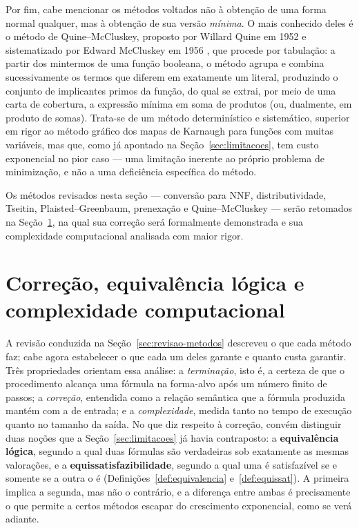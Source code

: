 \documentclass[12pt,a4paper,oneside]{report}
\theoremstyle{tituloplain}
\theoremstyle{titulodef}
\begin{document}
Por fim, cabe mencionar os métodos voltados não à obtenção de uma forma normal qualquer, mas à obtenção de sua versão \textit{mínima}. O mais conhecido deles é o método de Quine--McCluskey, proposto por Willard Quine em 1952 \cite{quine1952} e sistematizado por Edward McCluskey em 1956 \cite{mccluskey1956}, que procede por tabulação: a partir dos mintermos de uma função booleana, o método agrupa e combina sucessivamente os termos que diferem em exatamente um literal, produzindo o conjunto de implicantes primos da função, do qual se extrai, por meio de uma carta de cobertura, a expressão mínima em soma de produtos (ou, dualmente, em produto de somas). Trata-se de um método determinístico e sistemático, superior em rigor ao método gráfico dos mapas de Karnaugh para funções com muitas variáveis, mas que, como já apontado na Seção~\ref{sec:limitacoes}, tem custo exponencial no pior caso — uma limitação inerente ao próprio problema de minimização, e não a uma deficiência específica do método.
 
Os métodos revisados nesta seção — conversão para NNF, distributividade, Tseitin, Plaisted--Greenbaum, prenexação e Quine--McCluskey — serão retomados na Seção~\ref{sec:correcao-complexidade}, na qual sua correção será formalmente demonstrada e sua complexidade computacional analisada com maior rigor.

\section{Correção, equivalência lógica e complexidade computacional}\label{sec:correcao-complexidade}

A revisão conduzida na Seção~\ref{sec:revisao-metodos} descreveu o que cada método faz; cabe agora estabelecer o que cada um deles garante e quanto custa garantir. Três propriedades orientam essa análise: a \textit{terminação}, isto é, a certeza de que o procedimento alcança uma fórmula na forma-alvo após um número finito de passos; a \textit{correção}, entendida como a relação semântica que a fórmula produzida mantém com a de entrada; e a \textit{complexidade}, medida tanto no tempo de execução quanto no tamanho da saída. No que diz respeito à correção, convém distinguir duas noções que a Seção~\ref{sec:limitacoes} já havia contraposto: a \textbf{equivalência lógica}, segundo a qual duas fórmulas são verdadeiras sob exatamente as mesmas valorações, e a \textbf{equissatisfazibilidade}, segundo a qual uma é satisfazível se e somente se a outra o é (Definições~\ref{def:equivalencia} e~\ref{def:equissat}). A primeira implica a segunda, mas não o contrário, e a diferença entre ambas é precisamente o que permite a certos métodos escapar do crescimento exponencial, como se verá adiante.
 
\end{document}
